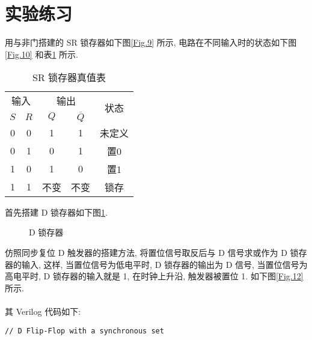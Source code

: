 \documentclass[UTF8,fontset=fandol]{ctexart}
\begin{document}
\section*{实验练习}
\begin{ExQuestions}
  \question 用与非门搭建的 SR 锁存器如下图\ref{Fig.9} 所示, 电路在不同输入时的状态如下图\ref{Fig.10} 和表\ref{Tab.2} 所示.\\
  \newpage
  \begin{table}[!ht]
    \centering
    \caption{SR 锁存器真值表}
    \label{Tab.2}
    \begin{tabular}{cc|cc|c} 
    \hline
    \multicolumn{2}{c|}{输入} & \multicolumn{2}{c|}{输出} & \multirow{2}{*}{状态}  \\ 
    \cline{1-4}
    $S$ & $R$               & $Q$ & $\overline{Q}$    &                      \\ 
    \hline
    0   & 0                 & 1  & 1                & 未定义                   \\
    0   & 1                 & 0   & 1                 & 置0                   \\
    1   & 0                 & 1   & 0                 & 置1                   \\
    1   & 1                 & 不变   & 不变                 & 锁存                 \\
    \hline
    \end{tabular}
    \end{table}
  \question 首先搭建 D 锁存器如下图\ref{Fig.11}.
  \begin{figure}[h]
    \centering
    \caption{D 锁存器}
    \label{Fig.11}
  \end{figure}
  仿照同步复位 D 触发器的搭建方法, 将置位信号取反后与 D 信号求或作为 D 锁存器的输入, 这样, 当置位信号为低电平时, D 锁存器的输出为 D 信号, 当置位信号为高电平时, D 锁存器的输入就是 1, 在时钟上升沿, 触发器被置位 1. 如下图\ref{Fig.12} 所示.\\
  \\
  其 Verilog 代码如下:
  \begin{lstlisting}[style=verilogstyle, caption={同步置位 D 触发器}, label={Code.6}]
// D Flip-Flop with a synchronous set

\end{lstlisting}
\end{ExQuestions}
\end{document}
